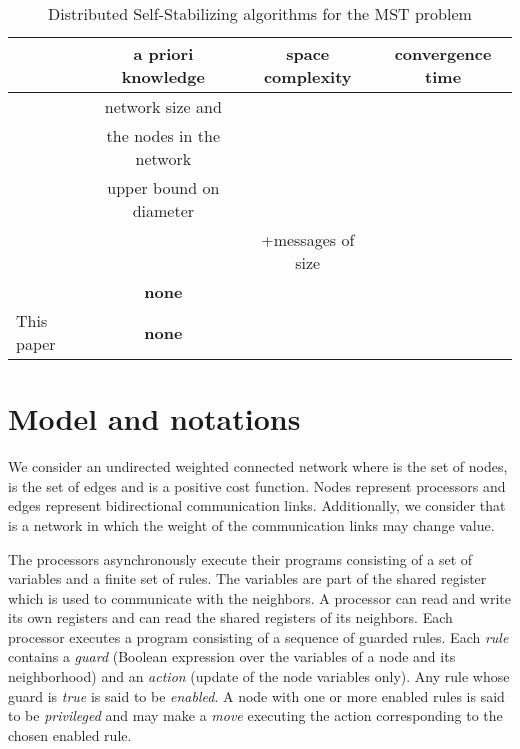 \documentclass[11pt,a4paper]{article}
\begin{document}
\begin{table}[t]
\begin{center}
\scalebox{1}
{
\begin{tabular}{|l|c|c|c|}
\hline
 & a priori knowledge & space complexity & convergence time\\
\hline
 \cite{AntonoiuS97} & network size and &  &  \\
 &  the nodes in the network & & \\
\hline
 \cite{HighamL01}& upper bound  on diameter && \\
 & & +messages of size  & \\
\hline
\cite{BPRT09c}  & \textbf{none} &   & \\
\hline
This paper & \textbf{none} &  & \\
\hline
\end{tabular}
}
\caption{\small Distributed Self-Stabilizing algorithms for the MST problem}
\label{tableresume}
\end{center}
\end{table}


\section{Model and notations} 
\label{sec:model}




We consider an undirected weighted connected network  where  is the set of nodes,  is the set of edges and  is a positive cost function. 
Nodes represent processors and edges represent bidirectional communication links. Additionally, we consider that  is a network in which the weight of the communication links may change value. 


The processors asynchronously execute their programs consisting of a set of variables and a finite set of rules. The variables are part of the shared register which is used to communicate with the neighbors. A processor can read and write its own registers and can read the shared registers of its neighbors. 
Each processor executes a program consisting of a sequence of guarded rules. Each \emph{rule} contains a \emph{guard} (Boolean expression over the variables of a node and its neighborhood) and an \emph{action} (update of the node variables only). Any rule whose guard is \emph{true} is said to be \emph{enabled}. A node with one or more enabled rules is said to be \emph{privileged} and may make a \emph{move} executing the action corresponding to the chosen enabled rule.
\end{document}
